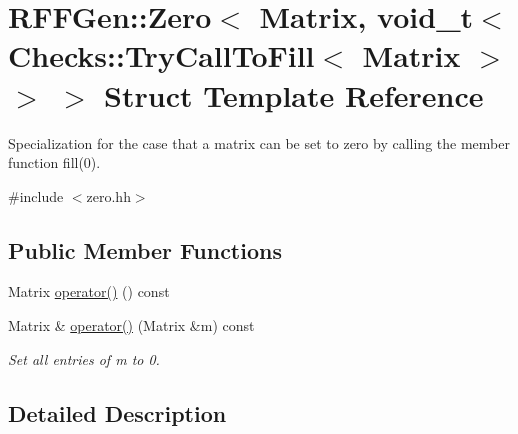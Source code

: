 \hypertarget{structRFFGen_1_1Zero_3_01Matrix_00_01void__t_3_01Checks_1_1TryCallToFill_3_01Matrix_01_4_01_4_01_4}{\section{R\-F\-F\-Gen\-:\-:Zero$<$ Matrix, void\-\_\-t$<$ Checks\-:\-:Try\-Call\-To\-Fill$<$ Matrix $>$ $>$ $>$ Struct Template Reference}
\label{structRFFGen_1_1Zero_3_01Matrix_00_01void__t_3_01Checks_1_1TryCallToFill_3_01Matrix_01_4_01_4_01_4}
}


Specialization for the case that a matrix can be set to zero by calling the member function fill(0).  




{\ttfamily \#include $<$zero.\-hh$>$}

\subsection*{Public Member Functions}
\begin{DoxyCompactItemize}
\item 
Matrix \hyperlink{structRFFGen_1_1Zero_3_01Matrix_00_01void__t_3_01Checks_1_1TryCallToFill_3_01Matrix_01_4_01_4_01_4_a26155bb593015ec0dcc114a38f1fb9f6}{operator()} () const 
\item 
\hypertarget{structRFFGen_1_1Zero_3_01Matrix_00_01void__t_3_01Checks_1_1TryCallToFill_3_01Matrix_01_4_01_4_01_4_a28a005b77149e0b13327831465a38594}{Matrix \& \hyperlink{structRFFGen_1_1Zero_3_01Matrix_00_01void__t_3_01Checks_1_1TryCallToFill_3_01Matrix_01_4_01_4_01_4_a28a005b77149e0b13327831465a38594}{operator()} (Matrix \&m) const }\label{structRFFGen_1_1Zero_3_01Matrix_00_01void__t_3_01Checks_1_1TryCallToFill_3_01Matrix_01_4_01_4_01_4_a28a005b77149e0b13327831465a38594}

\begin{DoxyCompactList}\small\item\em Set all entries of m to 0. \end{DoxyCompactList}\end{DoxyCompactItemize}


\subsection{Detailed Description}
